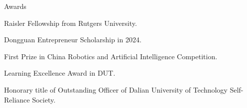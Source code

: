 \documentclass{resume} %
\begin{document}

\begin{rSection}{Awards}

\begin{rSubsection}{}{}
{}{}
    \item {Raisler Fellowship from Rutgers University.}\\
    \item {Dongguan Entrepreneur Scholarship in 2024.}\\
  \item {First Prize in China Robotics and Artificial Intelligence Competition.}\\
  \item {Learning Excellence Award in DUT.}\\
  \item {Honorary title of Outstanding Officer of Dalian University of Technology Self-Reliance Society.}\\
\end{rSubsection}
\end{rSection}


\newpage
\end{document}
